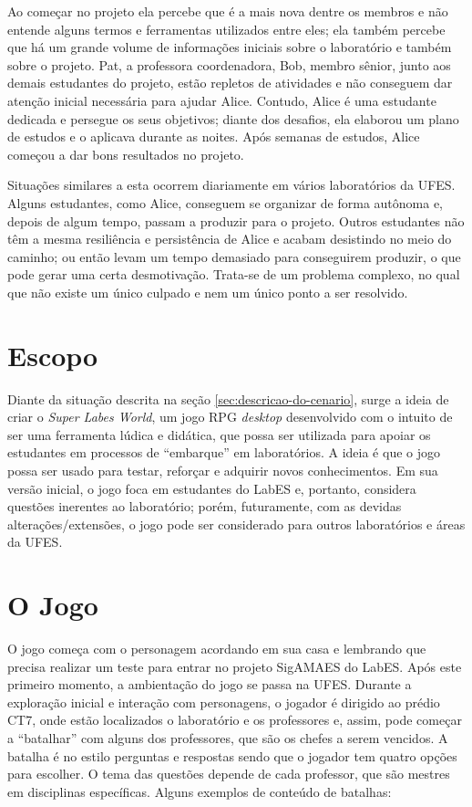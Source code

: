 Ao começar no projeto ela percebe que é a mais nova dentre os membros e não entende alguns termos e ferramentas utilizados entre eles; ela também percebe que há um grande volume de informações iniciais sobre o laboratório e também sobre o projeto. Pat, a professora coordenadora, Bob, membro sênior, junto aos demais estudantes do projeto, estão repletos de atividades e não conseguem dar atenção inicial necessária para ajudar Alice. Contudo, Alice é uma estudante dedicada e persegue os seus objetivos; diante dos desafios, ela elaborou um plano de estudos e o aplicava durante as noites. Após semanas de estudos, Alice começou a dar bons resultados no projeto.

Situações similares a esta ocorrem diariamente em vários laboratórios da UFES. Alguns estudantes, como Alice, conseguem se organizar de forma autônoma e, depois de algum tempo, passam a produzir para o projeto. Outros estudantes não têm a mesma resiliência e persistência de Alice e acabam desistindo no meio do caminho; ou então levam um tempo demasiado para conseguirem produzir, o que pode gerar uma certa desmotivação. Trata-se de um problema complexo, no qual que não existe um único culpado e nem um único ponto a ser resolvido. 

\section{Escopo}
\label{sec:escopo}
Diante da situação descrita na seção \ref{sec:descricao-do-cenario}, surge a ideia de criar o \textit{Super Labes World}, um jogo RPG \textit{desktop} desenvolvido com o intuito de ser uma ferramenta lúdica e didática, que possa ser utilizada para apoiar os estudantes em processos de ``embarque'' em laboratórios. A ideia é que o jogo possa ser usado para testar, reforçar e adquirir novos conhecimentos. Em sua versão inicial, o jogo foca em estudantes do LabES e, portanto, considera questões inerentes ao laboratório; porém, futuramente, com as devidas alterações/extensões, o jogo pode ser considerado para outros laboratórios e áreas da UFES.

\section{O Jogo}
\label{sec:jogo}

O jogo começa com o personagem acordando em sua casa e lembrando que precisa realizar um teste para entrar no projeto SigAMAES do LabES. Após este primeiro momento, a ambientação do jogo se passa na UFES. Durante a exploração inicial e interação com personagens, o jogador é dirigido ao prédio CT7, onde estão localizados o laboratório e os professores e, assim, pode começar a ``batalhar'' com alguns dos professores, que são os chefes a serem vencidos. A batalha é no estilo perguntas e respostas sendo que o jogador tem quatro opções para escolher. O tema das questões depende de cada professor, que são mestres em disciplinas específicas. Alguns exemplos de conteúdo de batalhas:

